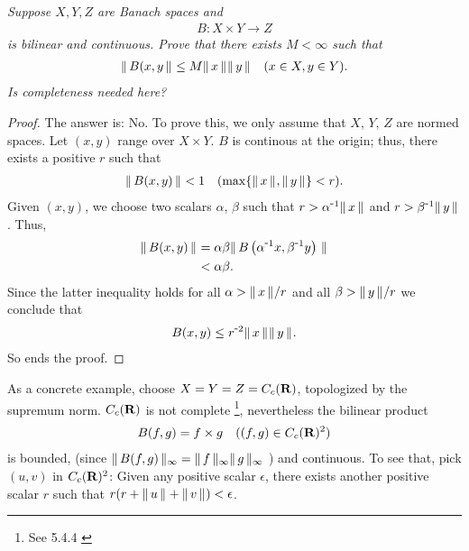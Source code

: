 \textit{
Suppose $X,Y,Z$ are Banach spaces and 
%
  \begin{align*}
    B:X\times Y \to Z
  \end{align*}
is bilinear and continuous. Prove that there exists $M<\infty$ such that 
%
  \begin{align*}
    \| \,B(x, y \, \|_{} \leq M \| \,x \, \|_{}\| \,y \, \|_{} \quad (x\in X, y\in Y).
  \end{align*}
%
Is completeness needed here?}
\begin{proof} The answer is: No. To prove this, we only assume that %
%
  $X$, $Y$, $Z$ %
%
are normed spaces. %
%
Let $(x, y)$ range over $X\times Y$. %
%
$B$ is continous at the origin; thus, there exists a positive $r$ such that %
%
  \begin{align}
    \| \,B(x,y) \, \|_{} < 1 \quad (\max\{\| \,x \, \|_{}, \| \,y \, \|_{}\} < r).
  \end{align}
%
Given $(x, y)$, we choose two scalars  %
%
  $\alpha$, $\beta$ %
%
such that %
%
  $r > \alpha^{\text{\small{-}} 1} \| \,x \, \|_{} $ and $r > \beta^{\text{\small{-}} 1} \| \,y \, \|_{}$. %
%
Thus, 
%
  \begin{align}
    \| \,B(x, y) \, \|_{} 
     & = 
    \alpha \beta \| \,
        B\left(
          \alpha^{\text{\small{-}} 1} x, 
          \beta^{\text{\small{-}} 1} y
        \right)
       \, \|_{}\\
    & < \alpha \beta.
  \end{align}
%
Since the latter inequality holds for all %
%
  $\alpha > \| \,x \, \|_{}/r $ and all $\beta > \| \,y \, \|_{}/r$ %
%
we conclude that %
%
  \begin{align}
      B(x, y)\leq 
    r^{\text{\small{-}} 2} \| \,x \, \|_{}\| \,y \, \|_{}.
  \end{align}
%
So ends the proof. %
%
\end{proof}
\noindent
%
As a concrete example, choose %
%
  $X = Y = Z = C_c({\mathbf R})$, %
%
topologized by the supremum norm. %
%
$C_c({\mathbf R})$ is not complete%
%
  \footnote{
    See 5.4.4 \cite{AnalyseIII} 
  }, %
nevertheless the bilinear product %
%
  \begin{align}
    B(f, g) = f\times g \quad ((f, g)\in C_c(\R)^2) %
  \end{align}
%
is bounded, (since %
    $\| \,B(f,g)  \, \|_{\infty} = \| \,f \, \|_{\infty}\| \,g \, \|_{\infty}$%
) %
and continuous. To see that, pick $(u, v)$ in $C_c({\mathbf R})^2$: %
Given any positive scalar $\epsilon$, %
there exists another positive scalar $r$ such that %
%
  $r(r + \| \,u \, \|_{} + \| \,v \, \|_{}) < \epsilon$. %
